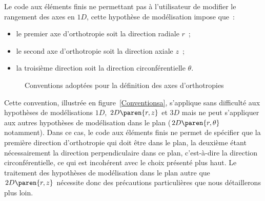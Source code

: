 Le code aux éléments finis \castem{} ne permettant pas à l'utilisateur
de modifier le rangement des axes en \(1D\), cette hypothèse de
modélisation impose que~:
\begin{itemize}
\item le premier axe d'orthotropie soit la direction radiale \(r\)~;
\item le second axe d'orthotropie soit la direction axiale \(z\)~;
\item la troisième direction soit la direction circonférentielle
  \(\theta\).
\end{itemize}

\begin{figure}[htbp]
  \centering
  \caption{Conventions adoptées pour la définition des axes d'orthotropies}
\end{figure}

Cette convention, illustrée en figure~\ref{Conventionsa}, s'applique
sans difficulté aux hypothèses de modélisations \(1D\),
\(2D\paren{r,z}\) et \(3D\) mais ne peut s'appliquer aux autres
hypothèses de modélisation dans le plan (\(2D\paren{r,\theta}\)
notamment). Dans ce cas, le code aux éléments finis \castem{} ne
permet de spécifier que la première direction d'orthotropie qui doit
être dans le plan, la deuxième étant nécessairement la direction
perpendiculaire dans ce plan, c'est-\-à-\-dire la direction
circonférentielle, ce qui est incohérent avec le choix présenté plus
haut. Le traitement des hypothèses de modélisation dans le plan autre
que \(2D\paren{r,z}\) nécessite donc des précautions particulières que
nous détaillerons plus loin.

